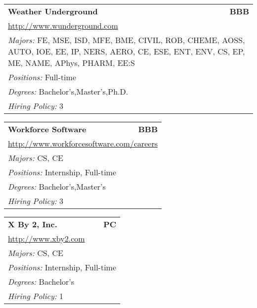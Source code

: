 \documentclass[twoside]{article}
\begin{document}
\begin{center}
\begin{multicols}{3}
\begin{FlushLeft}
\begin{minipage}{\columnwidth}
\end{minipage}
 
\begin{minipage}{\columnwidth}\begin{tabularx}{.95\columnwidth}{Xr}
                 {\Large\bf Weather Underground} & {\Large\bf BBB}\\
    \multicolumn{2}{p{.95\columnwidth}}{\url{http://www.wunderground.com}}\\
    \multicolumn{2}{p{.95\columnwidth}}{\emph{Majors:} FE, MSE, ISD, MFE, BME, CIVIL, ROB, CHEME, AOSS, AUTO, IOE, EE, IP, NERS, AERO, CE, ESE, ENT, ENV, CS, EP, ME, NAME, APhys, PHARM, EE:S}\\
    \multicolumn{2}{p{.95\columnwidth}}{\emph{Positions:} Full-time}\\
    \multicolumn{2}{p{.95\columnwidth}}{\emph{Degrees:} Bachelor's,Master's,Ph.D.}\\
    \multicolumn{2}{p{.95\columnwidth}}{\emph{Hiring Policy:} 3}\\
    \end{tabularx}
    
\end{minipage}
 
\begin{minipage}{\columnwidth}\begin{tabularx}{.95\columnwidth}{Xr}
                 {\Large\bf Workforce Software} & {\Large\bf BBB}\\
    \multicolumn{2}{p{.95\columnwidth}}{\url{http://www.workforcesoftware.com/careers}}\\
    \multicolumn{2}{p{.95\columnwidth}}{\emph{Majors:} CS, CE}\\
    \multicolumn{2}{p{.95\columnwidth}}{\emph{Positions:} Internship, Full-time}\\
    \multicolumn{2}{p{.95\columnwidth}}{\emph{Degrees:} Bachelor's,Master's}\\
    \multicolumn{2}{p{.95\columnwidth}}{\emph{Hiring Policy:} 3}\\
    \end{tabularx}
    
\end{minipage}
 
\begin{minipage}{\columnwidth}\begin{tabularx}{.95\columnwidth}{Xr}
                 {\Large\bf X By 2, Inc.} & {\Large\bf PC}\\
    \multicolumn{2}{p{.95\columnwidth}}{\url{http://www.xby2.com}}\\
    \multicolumn{2}{p{.95\columnwidth}}{\emph{Majors:} CS, CE}\\
    \multicolumn{2}{p{.95\columnwidth}}{\emph{Positions:} Internship, Full-time}\\
    \multicolumn{2}{p{.95\columnwidth}}{\emph{Degrees:} Bachelor's}\\
    \multicolumn{2}{p{.95\columnwidth}}{\emph{Hiring Policy:} 1}\\
    \end{tabularx}
    

\end{minipage}
\end{FlushLeft}
\end{multicols}
\end{center}
\end{document}
